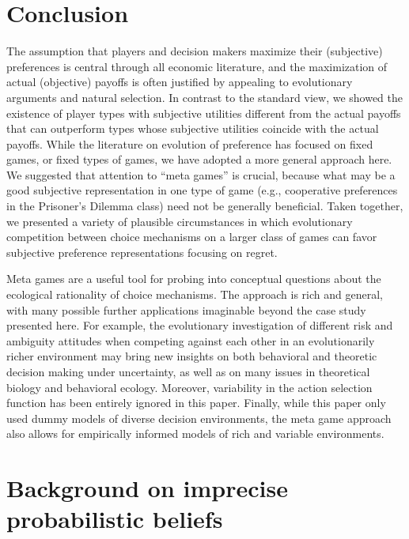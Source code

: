 \documentclass[fleqn,reqno,11pt]{article}
\begin{document}
\section{Conclusion} \label{sec:conclusion}


The assumption that players and decision makers maximize their (subjective) preferences is central through all economic literature, and the maximization of actual (objective) payoffs is often justified by appealing to evolutionary arguments and natural
selection. In contrast to the standard view, we showed the
existence of player types with subjective utilities different
from the actual payoffs that can outperform types whose
subjective utilities coincide with the actual payoffs.
While the literature on evolution of preference has focused
on fixed games, or fixed types of games, we have adopted a
more general approach here. We suggested that attention
to “meta games” is crucial, because what may be a good
subjective representation in one type of game (e.g., cooperative preferences in the Prisoner’s Dilemma class) need not
be generally beneficial. Taken together, we presented a variety of plausible circumstances in which evolutionary competition between choice
mechanisms on a larger class of games can favor subjective
preference representations focusing on regret.

Meta games are a useful tool for probing into conceptual questions about the ecological
rationality of choice mechanisms. The approach is rich and general, with many possible further
applications imaginable beyond the case study presented here. For example, the evolutionary
investigation of different risk and ambiguity attitudes when competing against each other in an
evolutionarily richer environment may bring new insights on both behavioral and theoretic
decision making under uncertainty, as well as on many issues in theoretical biology and
behavioral ecology. Moreover, variability in the action selection function has been entirely
ignored in this paper. Finally, while this paper only used dummy models of diverse decision
environments, the meta game approach also allows for empirically informed models of rich and
variable environments.


\appendix

\section{Background on imprecise probabilistic beliefs}
\label{sec:impr-prob-beli}
\end{document}
